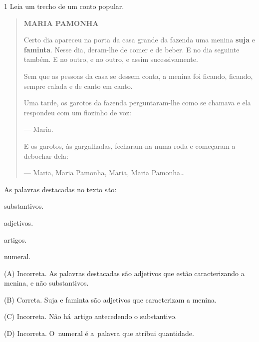 \begin{escolha}
\begin{escolha}
{\begin{escolha}

\num{1} Leia um trecho de um conto popular.

\begin{quote}
\textbf{MARIA PAMONHA}

Certo dia apareceu na porta da casa grande da fazenda uma menina
\textbf{suja} e \textbf{faminta}. Nesse dia, deram-lhe de comer e de
beber. E no dia seguinte também. E no outro, e no outro, e assim
sucessivamente.

Sem que as pessoas da casa se dessem conta, a menina foi ficando,
ficando, sempre calada e de canto em canto.

Uma tarde, os garotos da fazenda perguntaram-lhe como se chamava e ela
respondeu com um fiozinho de voz:

--- Maria.

E os garotos, às gargalhadas, fecharam-na numa roda e começaram a
debochar dela:

--- Maria, Maria Pamonha, Maria, Maria Pamonha\ldots{}
\end{quote}


As palavras destacadas no texto são:

\begin{escolha}
\item substantivos.

\item adjetivos.

\item artigos.

\item numeral.
\end{escolha}


(A) Incorreta. As palavras destacadas são adjetivos que estão
caracterizando a menina, e não substantivos.

(B) Correta. Suja e faminta são adjetivos que caracterizam a menina.

(C) Incorreta. Não há~artigo antecedendo o substantivo.

(D) Incorreta. O~numeral é a~palavra que atribui quantidade.


\end{escolha}}
\end{escolha}
\end{escolha}
